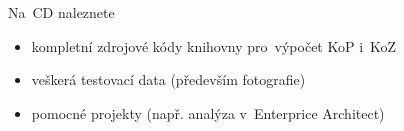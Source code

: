 
\listofappendices

Na~CD naleznete
\begin{itemize}
	\item {kompletní zdrojové kódy knihovny pro~výpočet KoP i~KoZ}
	\item {veškerá testovací data (především fotografie)}
	\item {pomocné projekty (např. analýza v~Enterprice Architect)}
\end{itemize}



